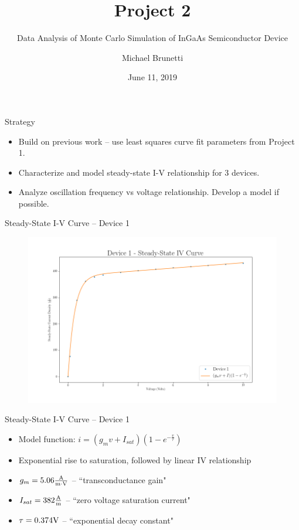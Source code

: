 \documentclass{beamer}
\title{Project 2}
\subtitle{Data Analysis of Monte Carlo Simulation of InGaAs Semiconductor Device}
\author{Michael Brunetti}
\institute{
EECE 5090 -- Linear Systems Analysis\\
UMass Lowell}
\date{June 11, 2019}
\begin{document}
 
\frame{\titlepage}

\begin{frame}{Strategy}
    \begin{itemize}
        \item Build on previous work -- use least squares curve fit parameters from Project 1.
        \item Characterize and model steady-state I-V relationship for 3 devices.
        \item Analyze oscillation frequency vs voltage relationship. Develop a model if possible.
    \end{itemize}
\end{frame}

\begin{frame}{Steady-State I-V Curve -- Device 1}
    \begin{figure}
        \centering
        \includegraphics[scale=0.35]{Figures/Device_1/SteadyState_fit.png}
        \label{fig:dev1_ss}
    \end{figure}
\end{frame}

\begin{frame}{Steady-State I-V Curve -- Device 1}
    \begin{itemize}
        \item Model function: $ i = \left( g_m v + I_{sat} \right) \left( 1 - e^{-\frac{v}{\tau}} \right) $
        \item Exponential rise to saturation, followed by linear IV relationship
        \item $g_m = 5.06 \frac{\textnormal{A}}{\textnormal{m} \cdot \textnormal{V}}$ -- ``transconductance gain"
        \item $I_{sat} = 382 \frac{\textnormal{A}}{\textnormal{m}}$ -- ``zero voltage saturation current"
        \item $\tau = 0.374 \textnormal{V}$ -- ``exponential decay constant"
    \end{itemize}
\end{frame}
\end{document}
